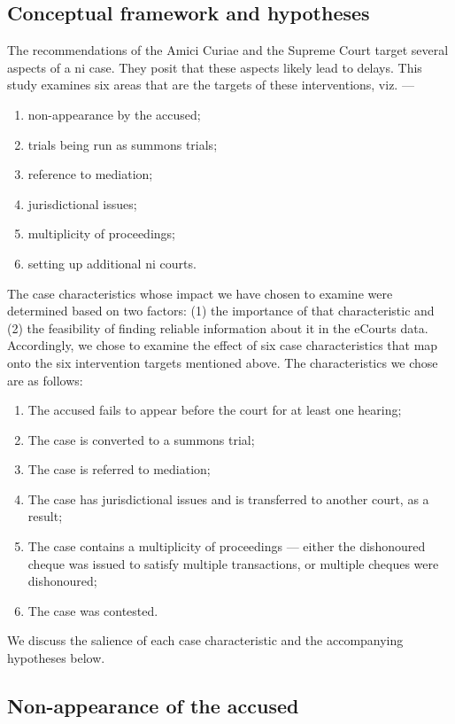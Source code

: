 \begin{enumerate}
\begin{enumerate}
\section{Conceptual framework and hypotheses}
\label{sec:select-case-char}

The recommendations of the Amici Curiae and the Supreme Court target several aspects of a \gls{ni} case. They posit that these aspects likely lead to delays. This study examines six areas that are the targets of these interventions, viz. ---

\begin{enumerate}
\item non-appearance by the accused;
\item trials being run as summons trials;
\item reference to mediation;
\item jurisdictional issues;
\item multiplicity of proceedings;
\item setting up additional \gls{ni} courts.
\end{enumerate}

The case characteristics whose impact we have chosen to examine were determined based on two factors: (1) the importance of that characteristic and (2) the feasibility of finding reliable information about it in the eCourts data. Accordingly, we chose to examine the effect of six case characteristics that map onto the six intervention targets mentioned above. The characteristics we chose are as follows:
\begin{enumerate}
\item The accused fails to appear before the court for at least one hearing;
\item The case is converted to a summons trial;
\item The case is referred to mediation;
\item The case has jurisdictional issues and is transferred to another court, as a result;
\item The case contains a multiplicity of proceedings --- either the dishonoured cheque was issued to satisfy multiple transactions, or multiple cheques were dishonoured;
\item The case was contested.
\end{enumerate}

We discuss the salience of each case characteristic and the accompanying hypotheses below.

\subsection{Non-appearance of the accused} 
\label{sec:non-appe-accus}


\end{enumerate}
\end{enumerate}
